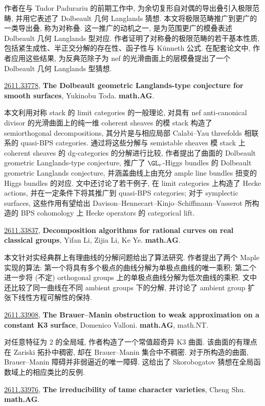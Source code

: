 \documentclass[9pt, a4paper]{article}
\theoremstyle{plain}
\theoremstyle{definition}
\theoremstyle{remark}
\newcommand{\arxivwithtarget}[3]{\hypertarget{#1}{}\href{https://arxiv.org/abs/#1}{#1}, \textbf{\textcolor{arxivblue}{#2}}, #3. }
\begin{document}
作者在与 Tudor Padurariu 的前期工作中, 为余切复形自对偶的导出叠引入极限范畴, 并用它表述了 Dolbeault 几何 Langlands 猜想. 本文将极限范畴推广到更广的一类导出叠, 称为对称叠. 这一推广的动机之一, 是为范围更广的模叠表述 Dolbeault 几何 Langlands 型对应. 作者证明了对称叠的极限范畴的若干基本性质, 包括紧生成性、半正交分解的存在性、函子性与 Künneth 公式. 在配套论文中, 作者应用这些结果, 为反典范除子为 nef 的光滑曲面上的层模叠提出了一个 Dolbeault 几何 Langlands 型猜想.


\arxivwithtarget{2611.33778}{The Dolbeault geometric Langlands-type conjecture for smooth surfaces}{Yukinobu Toda}\textbf{math.AG}.

本文利用对称 stack 的 limit categories 的一般理论, 对具有 nef anti-canonical divisor 的光滑曲面上的纯一维 coherent sheaves 的模 stack 构造了 semiorthogonal decompositions, 其分片是与相应局部 Calabi--Yau threefolds 相联系的 quasi-BPS categories. 通过将这些分解与 semistable sheaves 模 stack 上 coherent sheaves 的 dg-categories 的分解进行比较, 作者提出了曲面的 Dolbeault geometric Langlands-type conjecture, 推广了 $\GL_r$-Higgs bundles 的 Dolbeault geometric Langlands conjecture, 并涵盖曲线上由充分 ample line bundles 扭变的 Higgs bundles 的对应. 文中还讨论了若干例子, 在 limit categories 上构造了 Hecke actions, 并在一定条件下将其推广到 quasi-BPS categories; 对于 symplectic surfaces, 这些作用有望给出 Davison--Hennecart--Kinjo--Schiffmann--Vasserot 所构造的 BPS cohomology 上 Hecke operators 的 categorical lift.


\arxivwithtarget{2611.33837}{Decomposition algorithms for rational curves on real classical groups}{Yifan Li, Zijia Li, Ke Ye}\textbf{math.AG}.

本文针对实经典群上有理曲线的分解问题给出了算法研究. 作者提出了两个 Maple 实现的算法: 第一个将具有多个极点的曲线分解为单极点曲线的唯一乘积; 第二个进一步将 (不定) orthogonal groups 上的单极点曲线分解为低次曲线的乘积. 文中还比较了同一曲线在不同 ambient groups 下的分解, 并讨论了 ambient group 扩张下线性方程可解性的保持.


\arxivwithtarget{2611.33908}{The Brauer--Manin obstruction to weak approximation on a constant K3 surface}{Domenico Valloni}\textbf{math.AG}, math.NT.

对任意特征为 $2$ 的全局域, 作者构造了一个常值超奇异 K3 曲面. 该曲面的有理点在 Zariski 拓扑中稠密, 却在 Brauer--Manin 集合中不稠密. 对于所构造的曲面, Brauer--Manin 障碍并非弱逼近的唯一障碍. 这给出了 Skorobogatov 猜想在全局函数域上的相应类比的反例.


\arxivwithtarget{2611.33976}{The irreducibility of tame character varieties}{Cheng Shu}\textbf{math.AG}.
\end{document}
